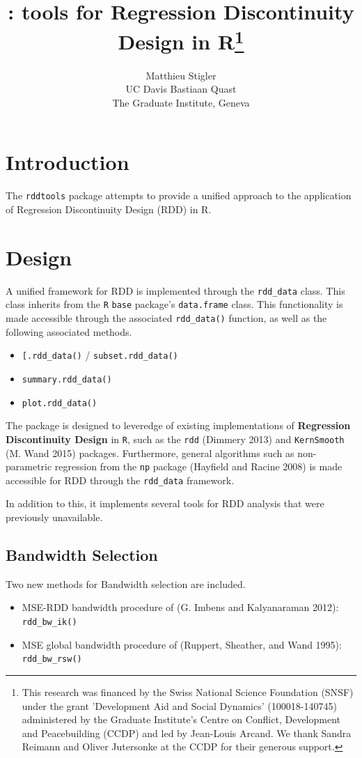 \documentclass[article]{jss}
\author{
Matthieu Stigler\\UC Davis \And Bastiaan Quast\\The Graduate Institute, Geneva
}
\title{\pkg{rddtools}: tools for Regression Discontinuity Design in
R\thanks{This research was financed by the Swiss National Science Foundation (SNSF) under the grant 'Development Aid and Social Dynamics' (100018-140745) administered by the Graduate Institute's Centre on Conflict, Development and Peacebuilding (CCDP) and led by Jean-Louis Arcand. We thank Sandra Reimann and Oliver Jutersonke at the CCDP for their generous support.}}
\begin{document}
\section{Introduction}\label{introduction}

The \texttt{rddtools} package attempts to provide a unified approach to
the application of Regression Discontinuity Design (RDD) in R.

\section{Design}\label{design}

A unified framework for RDD is implemented through the
\texttt{rdd\_data} class. This class inherits from the \texttt{R}
\texttt{base} package's \texttt{data.frame} class. This functionality is
made accessible through the associated \texttt{rdd\_data()} function, as
well as the following associated methods.

\begin{itemize}
\itemsep1pt\parskip0pt
\item
  \texttt{{[}.rdd\_data()} / \texttt{subset.rdd\_data()}
\item
  \texttt{summary.rdd\_data()}
\item
  \texttt{plot.rdd\_data()}
\end{itemize}

The package is designed to leveredge of existing implementations of
\textbf{Regression Discontinuity Design} in \texttt{R}, such as the
\texttt{rdd} (Dimmery 2013) and \texttt{KernSmooth} (M. Wand 2015)
packages. Furthermore, general algorithms such as non-parametric
regression from the \texttt{np} package (Hayfield and Racine 2008) is
made accessible for RDD through the \texttt{rdd\_data} framework.

In addition to this, it implements several tools for RDD analysis that
were previously unavailable.

\subsection{Bandwidth Selection}\label{bandwidth-selection}

Two new methods for Bandwidth selection are included.

\begin{itemize}
\itemsep1pt\parskip0pt
\item
  MSE-RDD bandwidth procedure of (G. Imbens and Kalyanaraman 2012):
  \texttt{rdd\_bw\_ik()}
\item
  MSE global bandwidth procedure of (Ruppert, Sheather, and Wand 1995):
  \texttt{rdd\_bw\_rsw()}
\end{itemize}
\end{document}
